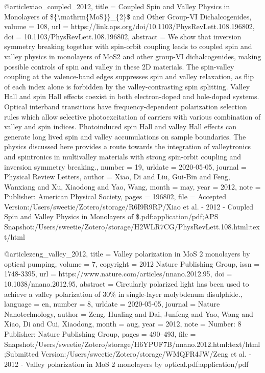 {@article{xiao_coupled_2012,
	title = {Coupled {Spin} and {Valley} {Physics} in {Monolayers} of \$\{{\textbackslash}mathrm\{{MoS}\}\}\_\{2\}\$ and {Other} {Group}-{VI} {Dichalcogenides}},
	volume = {108},
	url = {https://link.aps.org/doi/10.1103/PhysRevLett.108.196802},
	doi = {10.1103/PhysRevLett.108.196802},
	abstract = {We show that inversion symmetry breaking together with spin-orbit coupling leads to coupled spin and valley physics in monolayers of MoS2 and other group-VI dichalcogenides, making possible controls of spin and valley in these 2D materials. The spin-valley coupling at the valence-band edges suppresses spin and valley relaxation, as flip of each index alone is forbidden by the valley-contrasting spin splitting. Valley Hall and spin Hall effects coexist in both electron-doped and hole-doped systems. Optical interband transitions have frequency-dependent polarization selection rules which allow selective photoexcitation of carriers with various combination of valley and spin indices. Photoinduced spin Hall and valley Hall effects can generate long lived spin and valley accumulations on sample boundaries. The physics discussed here provides a route towards the integration of valleytronics and spintronics in multivalley materials with strong spin-orbit coupling and inversion symmetry breaking.},
	number = {19},
	urldate = {2020-05-05},
	journal = {Physical Review Letters},
	author = {Xiao, Di and Liu, Gui-Bin and Feng, Wanxiang and Xu, Xiaodong and Yao, Wang},
	month = may,
	year = {2012},
	note = {Publisher: American Physical Society},
	pages = {196802},
	file = {Accepted Version:/Users/sweetie/Zotero/storage/R6I9R9RP/Xiao et al. - 2012 - Coupled Spin and Valley Physics in Monolayers of \$.pdf:application/pdf;APS Snapshot:/Users/sweetie/Zotero/storage/H2WLR7CG/PhysRevLett.108.html:text/html}
}

@article{zeng_valley_2012,
	title = {Valley polarization in {MoS} 2 monolayers by optical pumping},
	volume = {7},
	copyright = {2012 Nature Publishing Group},
	issn = {1748-3395},
	url = {https://www.nature.com/articles/nnano.2012.95},
	doi = {10.1038/nnano.2012.95},
	abstract = {Circularly polarized light has been used to achieve a valley polarization of 30\% in single-layer molybdenum disulphide.},
	language = {en},
	number = {8},
	urldate = {2020-05-05},
	journal = {Nature Nanotechnology},
	author = {Zeng, Hualing and Dai, Junfeng and Yao, Wang and Xiao, Di and Cui, Xiaodong},
	month = aug,
	year = {2012},
	note = {Number: 8
Publisher: Nature Publishing Group},
	pages = {490--493},
	file = {Snapshot:/Users/sweetie/Zotero/storage/H6YPUF7B/nnano.2012.html:text/html;Submitted Version:/Users/sweetie/Zotero/storage/WMQFR4JW/Zeng et al. - 2012 - Valley polarization in MoS 2 monolayers by optical.pdf:application/pdf}
}

}
